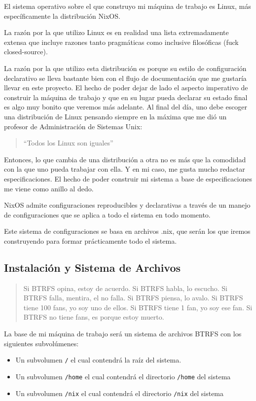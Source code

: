 \documentclass[11pt]{article}
\begin{document}
El sistema operativo sobre el que construyo mi máquina de trabajo es Linux, más específicamente la distribución NixOS.

La razón por la que utilizo Linux es en realidad una lista extremadamente extensa que incluye razones tanto pragmáticas como inclusive filosóficas (fuck closed-source).

La razón por la que utilizo esta distribución es porque su estilo de configuración declarativo se lleva bastante bien con el flujo de documentación que me gustaría llevar en este proyecto. El hecho de poder dejar de lado el aspecto imperativo de construir la máquina de trabajo y que en su lugar pueda declarar su estado final es algo muy bonito que veremos más adelante. Al final del día, uno debe escoger una distribución de Linux pensando siempre en la máxima que me dió un profesor de Administración de Sistemas Unix:

\begin{quote}
``Todos los Linux son iguales''
\end{quote}

Entonces, lo que cambia de una distribución a otra no es más que la comodidad con la que uno pueda trabajar con ella. Y en mi caso, me gusta mucho redactar especificaciones. El hecho de poder construir mi sistema a base de especificaciones me viene como anillo al dedo.

NixOS admite configuraciones reproducibles y declarativas a través de un manejo de configuraciones que se aplica a todo el sistema en todo momento.

Este sistema de configuraciones se basa en archivos .nix, que serán los que iremos construyendo para formar prácticamente todo el sistema.
\subsection{Instalación y Sistema de Archivos}
\label{sec:org8c4519a}

\begin{quote}
Si BTRFS opina, estoy de acuerdo.
Si BTRFS habla, lo escucho.
Si BTRFS falla, mentira, el no falla.
Si BTRFS piensa, lo avalo.
Si BTRFS tiene 100 fans, yo soy uno de ellos.
Si BTRFS tiene 1 fan, yo soy ese fan.
Si BTRFS no tiene fans, es porque estoy muerto.
\end{quote}

La base de mi máquina de trabajo será un sistema de archivos BTRFS con los siguientes subvolúmenes:

\begin{itemize}
\item Un subvolumen \texttt{/} el cual contendrá la raíz del sistema.
\item Un subvolumen \texttt{/home} el cual contendrá el directorio \texttt{/home} del sistema
\item Un subvolumen \texttt{/nix} el cual contendrá el directorio \texttt{/nix} del sistema
\end{itemize}
\end{document}
